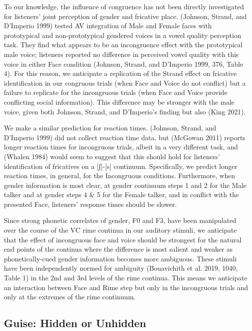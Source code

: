 \documentclass[
  letterpaper,
  DIV=11,
  numbers=noendperiod]{scrartcl}
\begin{document}
To our knowledge, the influence of congruence has not been directly
investigated for listeners' joint perception of gender and fricative
place. (Johnson, Strand, and D'Imperio 1999) tested AV integration of
Male and Female faces with prototypical and non-prototypical gendered
voices in a vowel quality perception task. They find what appears to be
an incongruence effect with the prototypical male voice; listeners
reported no difference in perceived vowel quality with this voice in
either Face condition (Johnson, Strand, and D'Imperio 1999, 376, Table
4). For this reason, we anticipate a replication of the Strand effect on
fricative identification in our congruous trials (when Face and Voice do
not conflict) but a failure to replicate for the incongruous trials
(when Face and Voice provide conflicting social information). This
difference may be stronger with the male voice, given both Johnson,
Strand, and D'Imperio's finding but also (King 2021).

We make a similar prediction for reaction times. (Johnson, Strand, and
D'Imperio 1999) did not collect reaction time data, but (McGowan 2011)
reports longer reaction times for incongruous trials, albeit in a very
different task, and (Whalen 1984) would seem to suggest that this should
hold for listeners' identification of fricatives on a {[}ʃ{]}-{[}s{]}
continuum. Specifically, we predict longer reaction times, in general,
for the Incongruous conditions. Furthermore, when gender information is
most clear, at gender continuum steps 1 and 2 for the Male talker and at
gender steps 4 \& 5 for the Female talker, and in conflict with the
presented Face, listeners' response times should be slower.

Since strong phonetic correlates of gender, F0 and F3, have been
manipulated over the course of the VC rime continua in our auditory
stimuli, we anticipate that the effect of incongruous face and voice
should be strongest for the natural end points of the continua where the
difference is most salient and weaker as phonetically-cued gender
information becomes more ambiguous. These stimuli have been
independently normed for ambiguity (Bouavichith et al. 2019, 1040, Table
1) in the 2nd and 3rd levels of the rime continua. This means we
anticipate an interaction between Face and Rime step but only in the
incongruous trials and only at the extremes of the rime continuum.

\subsection{Guise: Hidden or Unhidden}\label{sub-pred-guise}
\end{document}
